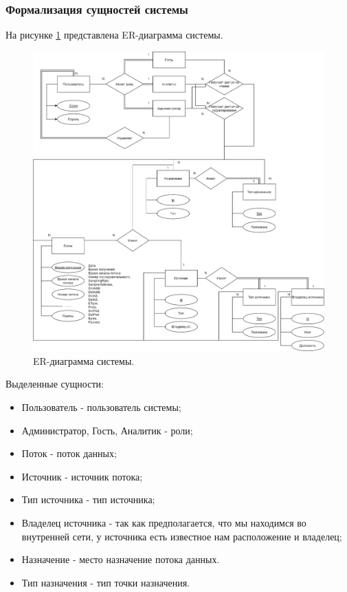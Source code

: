 \subsubsection{Формализация сущностей системы}
На рисунке \ref{ER} представлена ER-диаграмма системы.
\begin{figure}[H]
	\centering
	\includegraphics[scale=0.18]{ER.png}
	\caption{ER-диаграмма системы.}
	\label{ER}
\end{figure}
Выделенные сущности:
\begin{itemize}
	\item[1)] Пользователь - пользователь системы;
	\item[2)] Администратор, Гость, Аналитик - роли;
	\item[3)] Поток - поток данных;
	\item[4)] Источник - источник потока;
	\item[5)] Тип источника - тип источника;
	\item[6)] Владелец источника - так как предполагается, что мы находимся во внутренней сети, у источника есть известное нам расположение и владелец;
	\item[7)] Назначение - место назначение потока данных.
	\item[8)] Тип назначения - тип точки назначения.
\end{itemize}

